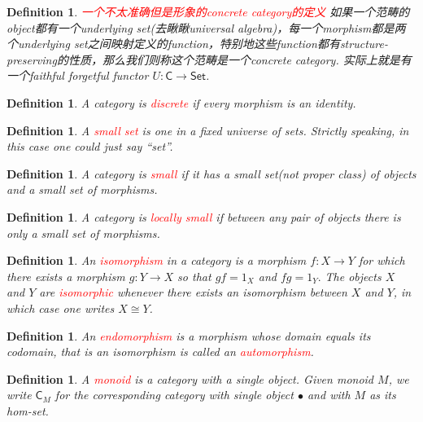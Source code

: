 \documentclass{article}
\newtheorem{definition}[theorem]{Definition}
\newcommand*{\cat}[1]{\textsf{#1}\xspace}
\newcommand{\Set}{\textsf{Set}\xspace}
\newcommand{\id}{1}
\newcommand*{\xfunc}[4]{{#2}\colon{#3}{#1}{#4}}
\newcommand*{\func}[3]{\xfunc{\to}{#1}{#2}{#3}}
\newcommand{\redt}[1]{\textcolor{red}{#1}}
\begin{document}
\begin{definition}
\rm \redt{一个不太准确但是形象的concrete category的定义} 如果一个范畴的object都有一个underlying set(去瞅瞅universal algebra)，每一个morphism都是两个underlying set之间映射定义的function，特别地这些function都有structure-preserving的性质，那么我们则称这个范畴是一个concrete category. 实际上就是有一个faithful forgetful functor $U:\cat{C} \to \Set$. 
\end{definition}

\begin{definition}
\rm A category is \redt{discrete} if every morphism is an identity.
\end{definition}

\begin{definition}
\rm A \redt{small set} is one in a fixed universe of sets. Strictly speaking, in this case one could just say “set”.
\end{definition}

\begin{definition}
\rm A category is \redt{small} if it has a small set(not proper class) of objects and a small set of morphisms.
\end{definition}


\begin{definition}
\rm A category is \redt{locally small} if between any pair of objects there is only a small set of morphisms. 
\end{definition}

\begin{definition}
\rm An \redt{isomorphism} in a category is a morphism $\func{f}{X}{Y}$ for which there exists a morphism $\func{g}{Y}{X}$ so that $gf= \id_X$ and $fg = \id_Y.$ The objects $X$ and $Y$ are \redt{isomorphic} whenever there exists an isomorphism between $X$ and $Y$, in which case one writes $X \cong Y$. 
\end{definition}

\begin{definition}
\rm An \redt{endomorphism} is a morphism whose domain equals its codomain, that is an isomorphism is called an \redt{automorphism}. 
\end{definition}

\begin{definition}
\rm A \redt{monoid} is a category with a single object. Given monoid $M$, we write $\cat{C}_{M}$ for the corresponding category with single object $\bullet$ and with $M$ as its hom-set. 
\end{definition}
\end{document}
